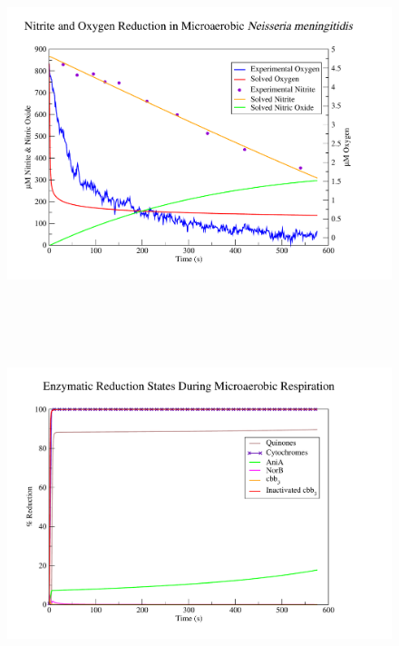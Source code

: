 \begin{figure}[!t]
 \centering
 \includegraphics[height=10cm, trim=1cm 1cm 3cm 1cm, clip=true]{./07-nitritereduction/data/dataset1-1.pdf}
\end{figure}
\begin{figure}[!b]
 \centering
 \includegraphics[height=10cm, trim=1cm 1cm 3cm 1cm, clip=true]{./07-nitritereduction/data/dataset1redox-1.pdf}
\end{figure}

